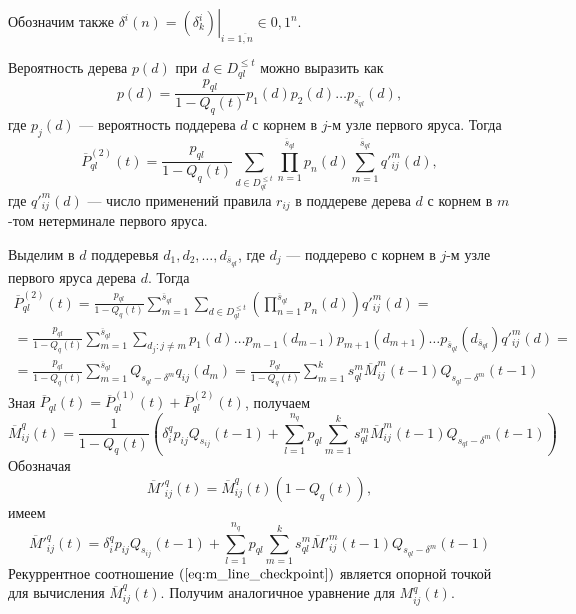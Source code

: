 \documentclass[12pt]{article}
\renewcommand{\leq}{\leqslant}
\begin{document}
{Обозначим также $\delta^i(n) = \left. \left( \delta^i_k \right) \right|_{i = \overline{1, n}} \in {0, 1}^n$.

Вероятность дерева $p(d)$ при $d \in D^{\leq t}_{ql}$ можно выразить как
\begin{equation*}
	p(d) = \frac{p_{ql}}{1 - Q_q(t)} p_1(d) p_2(d) \ldots p_{\overline{s_{ql}}}(d),
\end{equation*}
где $p_j(d)$ --- вероятность поддерева $d$ с корнем в $j$-м узле первого яруса. Тогда
\begin{equation*}
	\overline{P}^{(2)}_{ql}(t) = \frac{p_{ql}}{1 - Q_q(t)} \sum_{d \in D^{\leq t}_{ql}} \prod_{n=1}^{\overline{s}_{ql}} p_n(d) \sum_{m = 1}^{\overline{s}_{ql}} q'^m_{ij}(d),
\end{equation*}
где $q'^m_{ij}(d)$ --- число применений правила $r_{ij}$ в поддереве дерева $d$ с корнем в $m$-том нетерминале первого яруса.

Выделим в $d$ поддеревья $d_1, d_2, \ldots, d_{\overline{s}_{ql}}$, где $d_j$ --- поддерево с корнем в $j$-м узле первого яруса дерева $d$. Тогда
\begin{multline*}
	\overline{P}^{(2)}_{ql}(t) = \frac{p_{ql}}{1 - Q_q(t)} \sum_{m = 1}^{\overline{s}_{ql}} \sum_{d \in D^{\leq t}_{ql}} \left( \prod_{n = 1}^{\overline{s}_{ql}} p_n(d) \right) q'^m_{ij}(d) = \\
	= \frac{p_{ql}}{1 - Q_q(t)} \sum_{m = 1}^{\overline{s}_{ql}} \sum_{d_j : j \neq m} p_1(d) \ldots p_{m-1}(d_{m-1}) p_{m+1}(d_{m+1}) \ldots p_{\overline{s}_{ql}}(d_{\overline{s}_{ql}}) q'^m_{ij}(d) = \\
	= \frac{p_{ql}}{1 - Q_q(t)} \sum_{m = 1}^{\overline{s}_{ql}} Q_{s_{ql} - \delta^m} q_{ij}(d_m) = \frac{p_{ql}}{1 - Q_q(t)} \sum_{m = 1}^k s^m_{ql} \overline{M}^m_{ij}(t-1) Q_{s_{ql} - \delta^m}(t - 1)
\end{multline*}
Зная $\overline{P}_{ql}(t) = \overline{P}^{(1)}_{ql}(t) + \overline{P}^{(2)}_{ql}(t)$, получаем
\begin{equation*}
	\overline{M}^q_{ij}(t) = \frac{1}{1 - Q_q(t)} \left( \delta^q_i p_{ij} Q_{s_{ij}}(t - 1) + \sum_{l = 1}^{n_q} p_{ql} \sum_{m = 1}^k s^m_{ql} \overline{M}^m_{ij}(t - 1) Q_{s_{ql} - \delta^m}(t - 1) \right)
\end{equation*}
Обозначая
\begin{equation*}
	\overline{M}'^q_{ij}(t) = \overline{M}^q_{ij}(t) (1 - Q_q(t)),
\end{equation*}
имеем
\begin{equation}
\label{eq:m_line_checkpoint}
	\overline{M}'^q_{ij}(t) = \delta^q_i p_{ij} Q_{s_{ij}}(t - 1) + \sum_{l = 1}^{n_q} p_{ql} \sum_{m = 1}^k s^m_{ql} \overline{M}'^m_{ij}(t - 1) Q_{s_{ql} - \delta^m}(t - 1)
\end{equation}
Рекуррентное соотношение $(\ref{eq:m_line_checkpoint})$ является опорной точкой для вычисления $\overline{M}^q_{ij}(t)$. Получим аналогичное уравнение для $M^q_{ij}(t)$.

}
\end{document}
